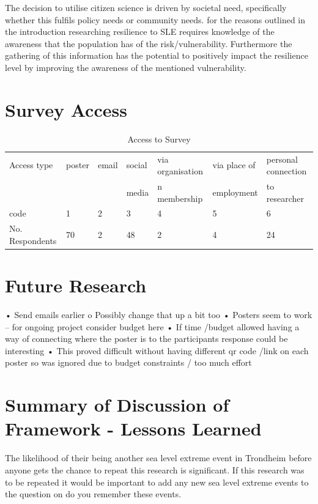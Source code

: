 The decision to utilise citizen science is driven by societal need, specifically whether this fulfils policy needs or community needs. for the reasons outlined in the introduction researching resilience to SLE requires knowledge of the awareness that the population has of the risk/vulnerability. Furthermore the gathering of this information has the potential to positively impact the resilience level by improving the awareness of the mentioned vulnerability. 

\section{Survey Access}

\begin{table}[!ht]
    \centering
    \begin{tabular}{|l|l|l|l|l|l|l|}
    \hline
     Access type & poster & email & social & via organisation  & via place of  & personal connection \\ \newline
       &  & & media & n membership & employment & to researcher \\ \hline
       code & 1 & 2 & 3 & 4 & 5 & 6 \\ \hline
      No. Respondents & 70 & 2 & 48 & 2 & 4 & 24 \\ \hline
    \end{tabular}
      \caption{Access to Survey}
      \label{access_survey}
\end{table}

\section{Future Research}
•	Send emails earlier
o	Possibly change that up a bit too
•	Posters seem to work – for ongoing project consider budget here
•	If time /budget allowed having a way of connecting where the poster is to the participants response could be interesting
•	This proved difficult without having different qr code /link on each poster so was ignored due to budget constraints / too much effort

\section{Summary of Discussion of Framework - Lessons Learned}


The likelihood of their being another sea level extreme event in Trondheim before anyone gets the chance to repeat this research is significant. If this research was to be repeated it would be important to add any new sea level extreme events to the question on do you remember these events. 